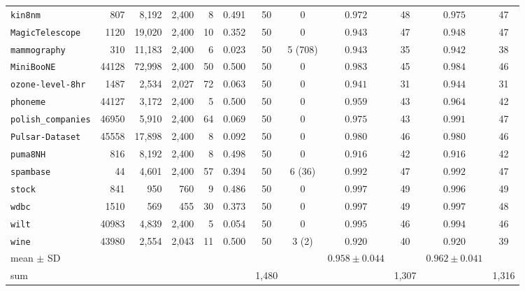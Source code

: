{\begin{tabular}{@{}lrrrrrcccccc@{}}
\texttt{kin8nm} & 807 & 8,192 & 2,400 & 8 & 0.491 & 50 & 0 & $0.972$ & 48 & $0.975$ & 47 \\
\texttt{MagicTelescope} & 1120 & 19,020 & 2,400 & 10 & 0.352 & 50 & 0 & $0.943$ & 47 & $0.948$ & 47 \\
\texttt{mammography} & 310 & 11,183 & 2,400 & 6 & 0.023 & 50 & 5 (708) & $0.943$ & 35 & $0.942$ & 38 \\
\texttt{MiniBooNE} & 44128 & 72,998 & 2,400 & 50 & 0.500 & 50 & 0 & $0.983$ & 45 & $0.984$ & 46 \\
\texttt{ozone-level-8hr} & 1487 & 2,534 & 2,027 & 72 & 0.063 & 50 & 0 & $0.941$ & 31 & $0.944$ & 31 \\
\texttt{phoneme} & 44127 & 3,172 & 2,400 & 5 & 0.500 & 50 & 0 & $0.959$ & 43 & $0.964$ & 42 \\
\texttt{polish\_companies} & 46950 & 5,910 & 2,400 & 64 & 0.069 & 50 & 0 & $0.975$ & 43 & $0.991$ & 47 \\
\texttt{Pulsar-Dataset} & 45558 & 17,898 & 2,400 & 8 & 0.092 & 50 & 0 & $0.980$ & 46 & $0.980$ & 46 \\
\texttt{puma8NH} & 816 & 8,192 & 2,400 & 8 & 0.498 & 50 & 0 & $0.916$ & 42 & $0.916$ & 42 \\
\texttt{spambase} & 44 & 4,601 & 2,400 & 57 & 0.394 & 50 & 6 (36) & $0.992$ & 47 & $0.992$ & 47 \\
\texttt{stock} & 841 & 950 & 760 & 9 & 0.486 & 50 & 0 & $0.997$ & 49 & $0.996$ & 49 \\
\texttt{wdbc} & 1510 & 569 & 455 & 30 & 0.373 & 50 & 0 & $0.997$ & 49 & $0.997$ & 48 \\
\texttt{wilt} & 40983 & 4,839 & 2,400 & 5 & 0.054 & 50 & 0 & $0.995$ & 46 & $0.994$ & 46 \\
\texttt{wine} & 43980 & 2,554 & 2,043 & 11 & 0.500 & 50 & 3 (2) & $0.920$ & 40 & $0.920$ & 39 \\
\midrule mean $\pm$ SD &  &  &  &  &  &  &  & $0.958 \pm 0.044$ &  & $0.962 \pm 0.041$ &  \\
sum &  &  &  &  &  & 1,480 & &  & 1,307 &  & 1,316 \\
\bottomrule\end{tabular}}
